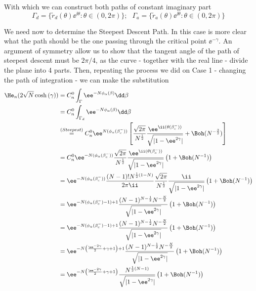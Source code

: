 With which we can construct both paths of constant imaginary part 
\begin{equation}
	\Gamma_d = \{ \tilde{r}_d(\theta) \ee^{\ii \theta} : \theta \in (0, 2\pi) \}; \ \ \ \Gamma_a = \{ \tilde{r}_a(\theta) \ee^{\ii \theta} : \theta \in (0, 2\pi) \} 
\end{equation}


We need now to determine the Steepest Descent Path. In this case is more clear what the path should be the one passing through the critical point $\ee^{-\gamma}$.  An argument of symmetry allow us to show that the tangent angle of the path of steepest descent must be $2\pi/4$, as the curve - together with the real line - divide the plane into 4 parts. Then, repeating the process we did on Case 1 - changing the path of integration - we can make the substitution
\begin{align}
		\He_{n}(2\sqrt{N}\cosh{(\gamma)}) &= C_n^0 \int_{\Gamma}  \ee^{-N \phi_\alpha(\beta)} \dd \beta \\
		&= C_n^0 \int_{\Gamma_d}  \ee^{-N \phi_\alpha(\beta)} \dd \beta \\
		& \stackrel{(Steepest)}{=}  C_n^0  \ee^{N(\phi_\alpha(\beta_c^-))} 
		\left[
		\frac{\sqrt{2\pi}}{N^{\frac{1}{2}}}
		\frac{\ee^{\ii (\theta(\beta_c^-))}}{\sqrt{|1 - \ee^{2\gamma}|}} 
		+ \Boh(N^{-\frac{3}{2}})
		\right]
		\\
		&= C_n^0  
		\ee^{-N(\phi_\alpha(\beta_c^-))}
		\frac{\sqrt{2\pi}}{N^{\frac{1}{2}}}
		\frac{\ee^{\ii (\theta(\beta_c^-))}}{\sqrt{|1 - \ee^{2\gamma}|}} 
		\left(1 + \Boh(N^{-1}) \right)
	    \\
		&= 	\ee^{-N(\phi_\alpha(\beta_c^-))} \frac{(N-1)! N^{\frac{1}{2}\left(1-N\right)}}{2\pi \ii} 
		\frac{\sqrt{2\pi}}{N^{\frac{1}{2}}}
		\frac{\ii}{\sqrt{|1 - \ee^{2\gamma}|}} 
		\left(1 + \Boh(N^{-1}) \right)
		\\
		&= 	\ee^{-N(\phi_\alpha(\beta_c^-) - 1) + 1} \frac{(N-1)^{N - \frac{1}{2}} N^{-\frac{N}{2}}}{\sqrt{|1 - \ee^{2\gamma}|}} 
		\left(1 + \Boh(N^{-1}) \right)
		\\
		& =	\ee^{-N( \phi_\alpha(\beta_c^-) - 1) + 1} \frac{(N-1)^{N - \frac{1}{2}} N^{-\frac{N}{2}}}{\sqrt{|1 - \ee^{2\gamma}|}} 
		\left(1 + \Boh(N^{-1}) \right) \\
		& =	\ee^{-N\left( \frac{\ee^{-2\gamma}}{2} + \gamma +  1\right) + 1} \frac{(N-1)^{N - \frac{1}{2}} N^{-\frac{N}{2}}}{\sqrt{|1 - \ee^{2\gamma}|}} 
		\left(1 + \Boh(N^{-1}) \right) \\
		& =	\ee^{-N\left( \frac{\ee^{-2\gamma}}{2} + \gamma +  1\right)} \frac{N^{\frac{1}{2}\left(N - 1\right)}}{\sqrt{|1 - \ee^{2\gamma}|}} 
		\left(1 + \Boh(N^{-1}) \right)
\end{align}
